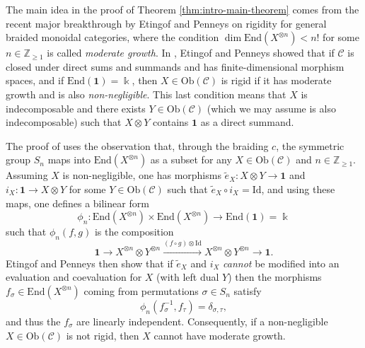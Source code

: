 \documentclass[11pt, reqno]{amsart}
\theoremstyle{definition}\newtheorem{defi}[thm]{Definition}
\theoremstyle{definition}\newtheorem{rem}[thm]{Remark}
\theoremstyle{definition}\newtheorem{exam}[thm]{Example}
\theoremstyle{definition}\newtheorem{assum}[thm]{Assumption}
\newcommand{\cC}{\mathcal{C}}
\newcommand{\til}{\widetilde}
\newcommand{\ZZ}{\mathbb{Z}}
\newcommand{\Id}{\mathrm{Id}}
\newcommand{\vac}{\mathbf{1}}
\begin{document}
The main idea in the proof of Theorem \ref{thm:intro-main-theorem} comes from the recent major breakthrough \cite{EP} by Etingof and Penneys on rigidity for general braided monoidal categories, where the condition $\dim\mathrm{End}(X^{\otimes n})<n!$ for some $n\in\ZZ_{\geq 1}$ is called \textit{moderate growth}. In \cite[Theorem 1.1]{EP}, Etingof and Penneys showed that if $\cC$ is closed under direct sums and summands and has finite-dimensional morphism spaces, and if $\mathrm{End}(\vac)=\Bbbk$, then $X\in\mathrm{Ob}(\cC)$ is rigid if it has moderate growth and is also \textit{non-negligible}. This last condition means that $X$ is indecomposable and there exists $Y\in\mathrm{Ob}(\cC)$ (which we may assume is also indecomposable) such that $X\otimes Y$ contains $\vac$ as a direct summand.

The proof of \cite[Theorem 1.1]{EP} uses the observation that, through the braiding $c$, the symmetric group $S_n$ maps into $\mathrm{End}(X^{\otimes n})$ as a subset for any $X\in\mathrm{Ob}(\cC)$ and $n\in\ZZ_{\geq 1}$. Assuming $X$ is non-negligible, one has morphisms $\til{e}_X: X\otimes Y\rightarrow\vac$ and $i_X:\vac\rightarrow X\otimes Y$ for some $Y\in\mathrm{Ob}(\cC)$ such that $\til{e}_X\circ i_X=\Id$, and using these maps, one defines a 
bilinear form 
\begin{equation*}
\phi_n: \mathrm{End}(X^{\otimes n})\times\mathrm{End}(X^{\otimes n})\longrightarrow\mathrm{End}(\vac)=\Bbbk
\end{equation*}
such that $\phi_n(f,g)$ is the composition
\begin{equation*}
\vac\longrightarrow X^{\otimes n}\otimes Y^{\otimes n} \xrightarrow{(f\circ g)\otimes\Id} X^{\otimes n}\otimes Y^{\otimes n}\longrightarrow\vac.
\end{equation*}
Etingof and Penneys then show that if $\til{e}_X$ and $i_X$ \textit{cannot} be modified into an evaluation and coevaluation for $X$ (with left dual $Y$) then the morphisms $f_\sigma\in\mathrm{End}(X^{\otimes n})$ coming from permutations $\sigma\in S_n$ satisfy
\begin{equation*}
\phi_n(f_\sigma^{-1},f_\tau)=\delta_{\sigma,\tau},
\end{equation*}
and thus the $f_\sigma$ are linearly independent. Consequently, if a non-negligible $X\in\mathrm{Ob}(\cC)$ is not rigid, then $X$ cannot have moderate growth.
\end{document}
